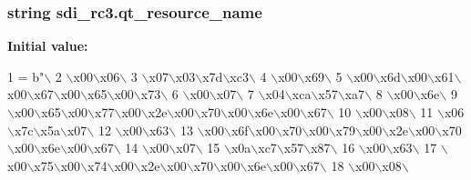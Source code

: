 \subsubsection[{qt\+\_\+resource\+\_\+name}]{\setlength{\rightskip}{0pt plus 5cm}string sdi\+\_\+rc3.\+qt\+\_\+resource\+\_\+name}\label{namespacesdi__rc3_a751b83ddf892d20d7591f6b6dfeccaa7}
{\bfseries Initial value\+:}
\begin{DoxyCode}
1 = b\textcolor{stringliteral}{"\(\backslash\)}
2 \textcolor{stringliteral}{\(\backslash\)x00\(\backslash\)x06\(\backslash\)}
3 \textcolor{stringliteral}{\(\backslash\)x07\(\backslash\)x03\(\backslash\)x7d\(\backslash\)xc3\(\backslash\)}
4 \textcolor{stringliteral}{\(\backslash\)x00\(\backslash\)x69\(\backslash\)}
5 \textcolor{stringliteral}{\(\backslash\)x00\(\backslash\)x6d\(\backslash\)x00\(\backslash\)x61\(\backslash\)x00\(\backslash\)x67\(\backslash\)x00\(\backslash\)x65\(\backslash\)x00\(\backslash\)x73\(\backslash\)}
6 \textcolor{stringliteral}{\(\backslash\)x00\(\backslash\)x07\(\backslash\)}
7 \textcolor{stringliteral}{\(\backslash\)x04\(\backslash\)xca\(\backslash\)x57\(\backslash\)xa7\(\backslash\)}
8 \textcolor{stringliteral}{\(\backslash\)x00\(\backslash\)x6e\(\backslash\)}
9 \textcolor{stringliteral}{\(\backslash\)x00\(\backslash\)x65\(\backslash\)x00\(\backslash\)x77\(\backslash\)x00\(\backslash\)x2e\(\backslash\)x00\(\backslash\)x70\(\backslash\)x00\(\backslash\)x6e\(\backslash\)x00\(\backslash\)x67\(\backslash\)}
10 \textcolor{stringliteral}{\(\backslash\)x00\(\backslash\)x08\(\backslash\)}
11 \textcolor{stringliteral}{\(\backslash\)x06\(\backslash\)x7c\(\backslash\)x5a\(\backslash\)x07\(\backslash\)}
12 \textcolor{stringliteral}{\(\backslash\)x00\(\backslash\)x63\(\backslash\)}
13 \textcolor{stringliteral}{\(\backslash\)x00\(\backslash\)x6f\(\backslash\)x00\(\backslash\)x70\(\backslash\)x00\(\backslash\)x79\(\backslash\)x00\(\backslash\)x2e\(\backslash\)x00\(\backslash\)x70\(\backslash\)x00\(\backslash\)x6e\(\backslash\)x00\(\backslash\)x67\(\backslash\)}
14 \textcolor{stringliteral}{\(\backslash\)x00\(\backslash\)x07\(\backslash\)}
15 \textcolor{stringliteral}{\(\backslash\)x0a\(\backslash\)xc7\(\backslash\)x57\(\backslash\)x87\(\backslash\)}
16 \textcolor{stringliteral}{\(\backslash\)x00\(\backslash\)x63\(\backslash\)}
17 \textcolor{stringliteral}{\(\backslash\)x00\(\backslash\)x75\(\backslash\)x00\(\backslash\)x74\(\backslash\)x00\(\backslash\)x2e\(\backslash\)x00\(\backslash\)x70\(\backslash\)x00\(\backslash\)x6e\(\backslash\)x00\(\backslash\)x67\(\backslash\)}
18 \textcolor{stringliteral}{\(\backslash\)x00\(\backslash\)x08\(\backslash\)}

\end{DoxyCode}
